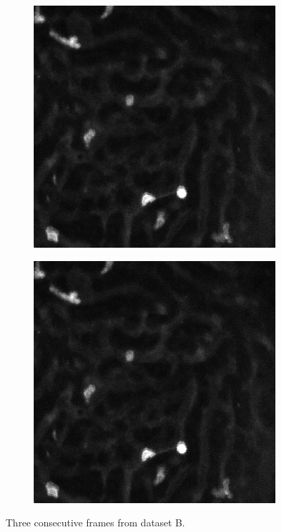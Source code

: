 \begin{figure}[h]
\begin{subfigure}{.32\textwidth}
		\includegraphics[width=\textwidth]{images/series30red025}
		\end{subfigure}
		\hfill
		\begin{subfigure}{.32\textwidth}
		\includegraphics[width=\textwidth]{images/series30red025}
		\end{subfigure}
		\caption{Three consecutive frames from dataset B.}
		\label{fig:data_datasetB}
	\end{figure}
		
